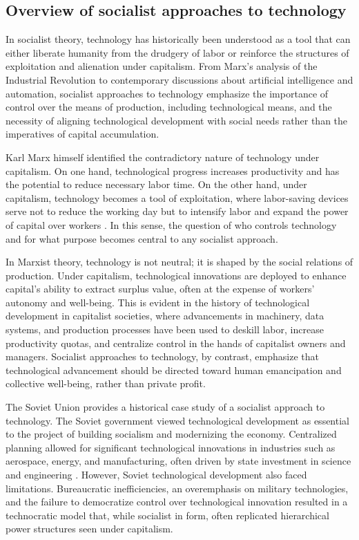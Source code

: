 \begin{refsection}
\subsection{Overview of socialist approaches to technology}

In socialist theory, technology has historically been understood as a tool that can either liberate humanity from the drudgery of labor or reinforce the structures of exploitation and alienation under capitalism. From Marx's analysis of the Industrial Revolution to contemporary discussions about artificial intelligence and automation, socialist approaches to technology emphasize the importance of control over the means of production, including technological means, and the necessity of aligning technological development with social needs rather than the imperatives of capital accumulation.

Karl Marx himself identified the contradictory nature of technology under capitalism. On one hand, technological progress increases productivity and has the potential to reduce necessary labor time. On the other hand, under capitalism, technology becomes a tool of exploitation, where labor-saving devices serve not to reduce the working day but to intensify labor and expand the power of capital over workers \cite[pp.~492-493]{marx}. In this sense, the question of who controls technology and for what purpose becomes central to any socialist approach.

In Marxist theory, technology is not neutral; it is shaped by the social relations of production. Under capitalism, technological innovations are deployed to enhance capital’s ability to extract surplus value, often at the expense of workers' autonomy and well-being. This is evident in the history of technological development in capitalist societies, where advancements in machinery, data systems, and production processes have been used to deskill labor, increase productivity quotas, and centralize control in the hands of capitalist owners and managers. Socialist approaches to technology, by contrast, emphasize that technological advancement should be directed toward human emancipation and collective well-being, rather than private profit.

The Soviet Union provides a historical case study of a socialist approach to technology. The Soviet government viewed technological development as essential to the project of building socialism and modernizing the economy. Centralized planning allowed for significant technological innovations in industries such as aerospace, energy, and manufacturing, often driven by state investment in science and engineering \cite[pp.~234]{coopersmith}. However, Soviet technological development also faced limitations. Bureaucratic inefficiencies, an overemphasis on military technologies, and the failure to democratize control over technological innovation resulted in a technocratic model that, while socialist in form, often replicated hierarchical power structures seen under capitalism.


\end{refsection}
